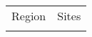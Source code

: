 \begin{table}
 \scriptsize
 \begin{tabularx}{\textwidth}{lX}
  \tophline
  Region   & Sites                                                                                                                                                                                                                                                                                                                                                                                                                                                                                                                                                                                                                                                                                                                                                                                                                                                                                                                                                                                                                                                                                                                                                                                                                                                                                                                                                                                                                                                                                                                                                                                                                                                                                                                                                                                                                                                                                                                                                                                                           \\
  \middlehline

\end{tabularx}
\end{table}
